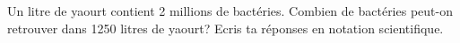 %
%
Un litre de yaourt contient 2 millions de bactéries. Combien de bactéries peut-on retrouver dans 1250 litres de yaourt? Ecris ta réponses en notation scientifique.

